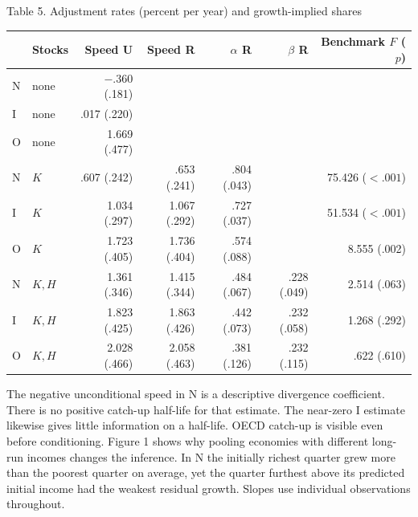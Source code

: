 \documentclass[11pt]{article}
\begin{document}
\begin{center}
\medskip
Table 5. Adjustment rates (percent per year) and growth-implied shares\\[3pt]
\begin{tabular}{llrrrrr}\toprule
&Stocks&Speed U&Speed R&$\alpha$ R&$\beta$ R&Benchmark $F$ ($p$)\\\midrule
N&none&$-.360$ (.181)&&&&\\
I&none&.017 (.220)&&&&\\
O&none&1.669 (.477)&&&&\\
N&$K$&.607 (.242)&.653 (.241)&.804 (.043)&&75.426 ($<.001$)\\
I&$K$&1.034 (.297)&1.067 (.292)&.727 (.037)&&51.534 ($<.001$)\\
O&$K$&1.723 (.405)&1.736 (.404)&.574 (.088)&&8.555 (.002)\\
N&$K,H$&1.361 (.346)&1.415 (.344)&.484 (.067)&.228 (.049)&2.514 (.063)\\
I&$K,H$&1.823 (.425)&1.863 (.426)&.442 (.073)&.232 (.058)&1.268 (.292)\\
O&$K,H$&2.028 (.466)&2.058 (.463)&.381 (.126)&.232 (.115)&.622 (.610)\\\bottomrule
\end{tabular}\end{center}

The negative unconditional speed in N is a descriptive divergence coefficient. There is no positive catch-up half-life for that estimate. The near-zero I estimate likewise gives little information on a half-life. OECD catch-up is visible even before conditioning. Figure 1 shows why pooling economies with different long-run incomes changes the inference. In N the initially richest quarter grew more than the poorest quarter on average, yet the quarter furthest above its predicted initial income had the weakest residual growth. Slopes use individual observations throughout.
\end{document}
